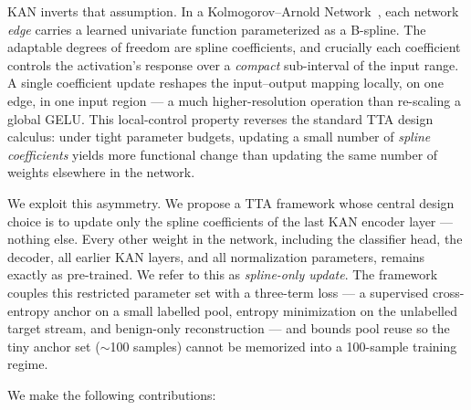 \documentclass[10pt, conference, letterpaper]{IEEEtran}
\begin{document}
KAN inverts that assumption. In a Kolmogorov--Arnold Network~\cite{liu2024kan}, each network \emph{edge} carries a learned univariate function parameterized as a B-spline. The adaptable degrees of freedom are spline coefficients, and crucially each coefficient controls the activation's response over a \emph{compact} sub-interval of the input range. A single coefficient update reshapes the input--output mapping locally, on one edge, in one input region --- a much higher-resolution operation than re-scaling a global GELU. This local-control property reverses the standard TTA design calculus: under tight parameter budgets, updating a small number of \emph{spline coefficients} yields more functional change than updating the same number of weights elsewhere in the network.

We exploit this asymmetry. We propose a TTA framework whose central design choice is to update only the spline coefficients of the last KAN encoder layer --- nothing else. Every other weight in the network, including the classifier head, the decoder, all earlier KAN layers, and all normalization parameters, remains exactly as pre-trained. We refer to this as \emph{spline-only update}. The framework couples this restricted parameter set with a three-term loss --- a supervised cross-entropy anchor on a small labelled pool, entropy minimization on the unlabelled target stream, and benign-only reconstruction --- and bounds pool reuse so the tiny anchor set ($\sim$100 samples) cannot be memorized into a 100-sample training regime.

We make the following contributions:
\end{document}
